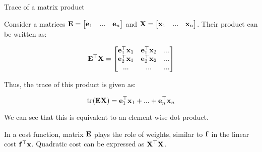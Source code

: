 \documentclass{beamer}
\begin{document}
\begin{frame}{Trace of a matrix product}
	\begin{flushleft}
		
		Consider a matrices $\mathbf{E} = \begin{bmatrix}
			\mathbf{e}_1 & ... & \mathbf{e}_n
		\end{bmatrix}$ and 
		$\mathbf{X} = \begin{bmatrix}
			\mathbf{x}_1 & ... & \mathbf{x}_n
		\end{bmatrix}$. Their product can be written as:
		
		\begin{equation}
			\mathbf{E}^\top \mathbf{X} = 
			\begin{bmatrix}
				\mathbf{e}_1 ^\top \mathbf{x}_1 & \mathbf{e}_1 ^\top \mathbf{x}_2 & ... \\
				\mathbf{e}_2 ^\top \mathbf{x}_1 & \mathbf{e}_2 ^\top \mathbf{x}_2 & ... \\
				... & ... & ... 
			\end{bmatrix}
		\end{equation}
		
		Thus, the trace of this product is given as:
		
		\begin{equation}
			\text{tr}(\mathbf{E}\mathbf{X}) =  \mathbf{e}_1 ^\top \mathbf{x}_1 + ... + \mathbf{e}_n ^\top \mathbf{x}_n
		\end{equation}
		
		We can see that this is equivalent to an element-wise dot product. 
		
		\bigskip
		
		In a cost function, matrix $\mathbf{E}$ plays the role of weights, similar to $\mathbf{f}$ in the linear cost $\mathbf{f}^\top \mathbf{x}$. Quadratic cost can be expressed as $\mathbf{X}^\top\mathbf{X}$.
		
	\end{flushleft}
\end{frame}
\end{document}
